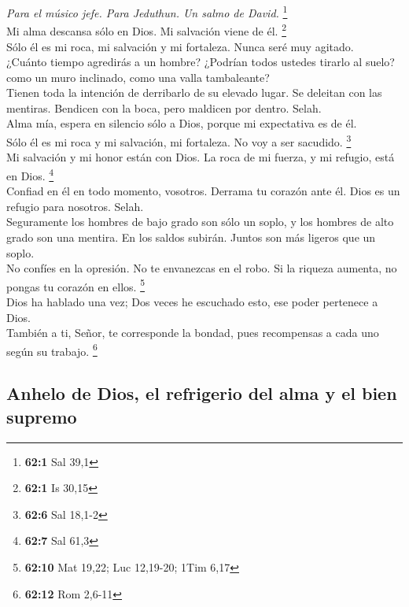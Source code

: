 \emph{Para el músico jefe. Para Jeduthun. Un salmo de David.}
\footnote{\textbf{62:1} Sal 39,1}\\
 Mi alma descansa sólo en Dios. Mi salvación viene de él.
\footnote{\textbf{62:1} Is 30,15}\\
 Sólo él es mi roca, mi salvación y mi fortaleza. Nunca
seré muy agitado.\\
 ¿Cuánto tiempo agredirás a un hombre? ¿Podrían todos
ustedes tirarlo al suelo? como un muro inclinado, como una valla
tambaleante?\\
 Tienen toda la intención de derribarlo de su elevado
lugar. Se deleitan con las mentiras. Bendicen con la boca, pero maldicen
por dentro. Selah.\\
 Alma mía, espera en silencio sólo a Dios, porque mi
expectativa es de él.\\
 Sólo él es mi roca y mi salvación, mi fortaleza. No voy a
ser sacudido. \footnote{\textbf{62:6} Sal 18,1-2}\\
 Mi salvación y mi honor están con Dios. La roca de mi
fuerza, y mi refugio, está en Dios. \footnote{\textbf{62:7} Sal 61,3}\\
 Confiad en él en todo momento, vosotros. Derrama tu
corazón ante él. Dios es un refugio para nosotros. Selah.\\
 Seguramente los hombres de bajo grado son sólo un soplo,
y los hombres de alto grado son una mentira. En los saldos subirán.
Juntos son más ligeros que un soplo.\\
 No confíes en la opresión. No te envanezcas en el robo.
Si la riqueza aumenta, no pongas tu corazón en ellos. \footnote{\textbf{62:10}
  Mat 19,22; Luc 12,19-20; 1Tim 6,17}\\
 Dios ha hablado una vez; Dos veces he escuchado esto,
ese poder pertenece a Dios.\\
 También a ti, Señor, te corresponde la bondad, pues
recompensas a cada uno según su trabajo. \footnote{\textbf{62:12} Rom
  2,6-11}

\hypertarget{anhelo-de-dios-el-refrigerio-del-alma-y-el-bien-supremo}{%
\subsection{Anhelo de Dios, el refrigerio del alma y el bien
supremo}\label{anhelo-de-dios-el-refrigerio-del-alma-y-el-bien-supremo}}

